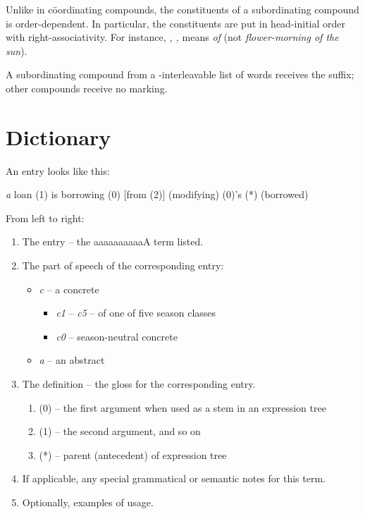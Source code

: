 \documentclass{book}
\newcommand{\lname}{aaaaaaaaaaA}
\begin{document}
Unlike in cöordinating compounds, the constituents of a subordinating compound is order-dependent. In particular, the constituents are put in head-initial order with right-associativity. For instance,  \emph{, , } means \emph{ of } (not \emph{flower-morning of the sun}).

A subordinating compound from a \tieq-interleavable list of words receives the  suffix; other compounds receive no marking.

\appendix

\chapter{Dictionary}

An entry looks like this:

 \textit{a}
\quad loan \quad (1) is borrowing (0) [from (2)] \quad (modifying) (0)'s (*) (borrowed)

From left to right:

\begin{enumerate}
    \item The entry -- the \lname{} term listed.
    \item The part of speech of the corresponding entry:
    \begin{itemize}
        \item \textit{c} -- a concrete
        \begin{itemize}
            \item \textit{c1} -- \textit{c5} -- of one of five season classes
            \item \textit{c0} -- season-neutral concrete
        \end{itemize}
        \item \textit{a} -- an abstract
    \end{itemize}
    \item The definition -- the gloss for the corresponding entry.
    \begin{enumerate}
        \item (0) -- the first argument when used as a stem in an expression tree
        \item (1) -- the second argument, and so on
        \item (*) -- parent (antecedent) of expression tree
    \end{enumerate}
    \item If applicable, any special grammatical or semantic notes for this term.
    \item Optionally, examples of usage.
\end{enumerate}

\begin{multicols}{2}
    
\end{multicols}
\end{document}
